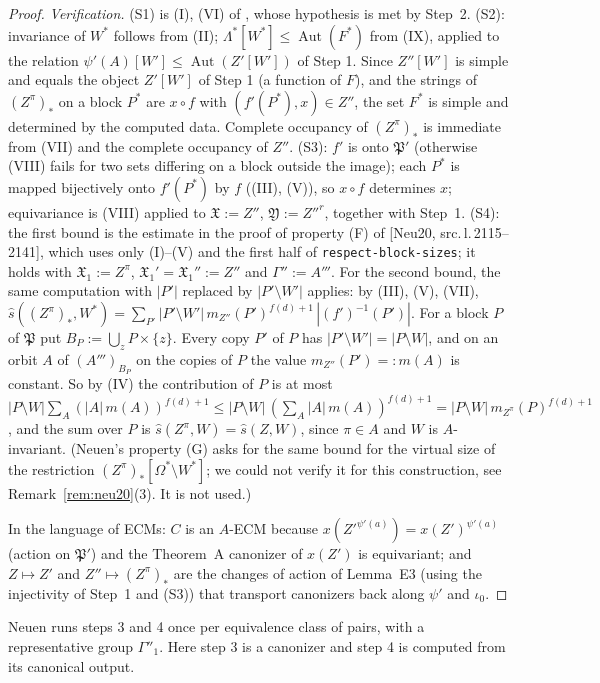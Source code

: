 \documentclass[11pt]{article}
\theoremstyle{plain}
\theoremstyle{definition}
\theoremstyle{remark}
\theoremstyle{named}
\theoremstyle{namedrm}
\newcommand{\Aut}{\operatorname{Aut}}
\newcommand{\fX}{\mathfrak{X}}
\newcommand{\fP}{\mathfrak{P}}
\newcommand{\src}[2]{[#1, src.\,l.\,#2]}
\begin{document}
\begin{proof}
\emph{Verification.} (S1) is (I), (VI) of \cite[Thm.~4.9]{Neu20}, whose hypothesis is met by Step~2. (S2): invariance of $W^*$ follows from (II); $\Lambda^*[W^*]\le\Aut(F^*)$ from (IX),
applied to the relation $\psi'(A)[W']\le\Aut(Z'[W'])$ of Step 1. Since $Z''[W']$ is simple and equals the object
$Z'[W']$ of Step 1 (a function of $F$), and the strings of $(Z^\pi)_*$ on a block $P^*$ are $x\circ f$ with
$(f'(P^*),x)\in Z''$, the set $F^*$ is simple and determined by the computed data.
Complete occupancy of $(Z^\pi)_*$ is immediate from (VII) and the complete occupancy of $Z''$. (S3): $f'$ is
onto $\fP'$ (otherwise (VIII) fails for two sets differing on a block outside the image); each $P^*$ is mapped
bijectively onto $f'(P^*)$ by $f$ ((III), (V)), so $x\circ f$ determines $x$; equivariance is (VIII) applied to $\fX:=Z''$,
$\mathfrak Y:=Z''^{r}$, together with Step~1. (S4): the first bound is the estimate in the proof of property (F) of
\cite[Thm.~4.17]{Neu20} \src{Neu20}{2115--2141}, which uses only (I)--(V) and the first half of \texttt{respect-block-sizes}; it holds with
$\fX_1:=Z^\pi$, $\fX_1'=\fX_1'':=Z''$ and $\Gamma'':=A'''$. For the second bound, the same computation with $|P'|$ replaced by $|P'\setminus W'|$ applies:
by (III), (V), (VII),
$\widehat s((Z^\pi)_*,W^*)=\sum_{P'}|P'\setminus W'|\,m_{Z''}(P')^{f(d)+1}\,|(f')^{-1}(P')|$. For a block $P$ of $\fP$ put $B_P:=\bigcup_zP\times\{z\}$. Every copy $P'$ of $P$ has $|P'\setminus W'|=|P\setminus W|$, and on
an orbit $A$ of $(A''')_{B_P}$ on the copies of $P$ the value $m_{Z''}(P')=:m(A)$ is constant. So by (IV) the contribution of $P$ is at most
$|P\setminus W|\sum_A(|A|\,m(A))^{f(d)+1}\le|P\setminus W|\,(\sum_A|A|\,m(A))^{f(d)+1}=|P\setminus W|\,m_{Z^\pi}(P)^{f(d)+1}$, and the sum over $P$ is
$\widehat s(Z^\pi,W)=\widehat s(Z,W)$, since $\pi\in A$ and $W$ is $A$-invariant.
(Neuen's property (G) asks for the same bound for the virtual size of the restriction $(Z^\pi)_*[\Omega^*\setminus W^*]$; we could not verify it for this construction, see Remark~\ref{rem:neu20}(3). It is not used.)

In the language of ECMs: $C$ is an $A$-ECM because $x(Z'^{\psi'(a)})=x(Z')^{\psi'(a)}$ (action on $\fP'$) and the Theorem~A
canonizer of $x(Z')$ is equivariant; and $Z\mapsto Z'$ and $Z''\mapsto(Z^\pi)_*$ are the changes of action of Lemma~E3 (using
the injectivity of Step~1 and (S3)) that transport canonizers back along $\psi'$ and $\iota_0$.
\end{proof}
Neuen runs steps 3 and 4 once per equivalence class of pairs, with a representative group $\Gamma''_1$. Here
step 3 is a canonizer and step 4 is computed from its canonical output.
\end{document}
